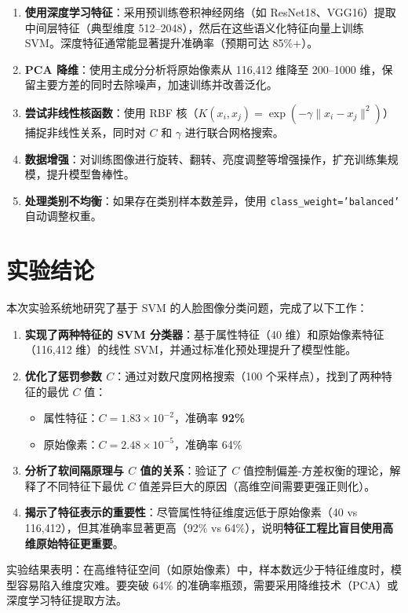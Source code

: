 \documentclass[UTF8]{ctexart}
\begin{document}
\begin{enumerate}
    \item \textbf{使用深度学习特征}：采用预训练卷积神经网络（如 ResNet18、VGG16）提取中间层特征（典型维度 512--2048），然后在这些语义化特征向量上训练 SVM。深度特征通常能显著提升准确率（预期可达 85\%+）。
    
    \item \textbf{PCA 降维}：使用主成分分析将原始像素从 116,412 维降至 200--1000 维，保留主要方差的同时去除噪声，加速训练并改善泛化。
    
    \item \textbf{尝试非线性核函数}：使用 RBF 核（$K(x_i, x_j) = \exp(-\gamma \|x_i - x_j\|^2)$）捕捉非线性关系，同时对 $C$ 和 $\gamma$ 进行联合网格搜索。
    
    \item \textbf{数据增强}：对训练图像进行旋转、翻转、亮度调整等增强操作，扩充训练集规模，提升模型鲁棒性。
    
    \item \textbf{处理类别不均衡}：如果存在类别样本数差异，使用 \texttt{class\_weight='balanced'} 自动调整权重。
\end{enumerate}

\section{实验结论}

本次实验系统地研究了基于 SVM 的人脸图像分类问题，完成了以下工作：

\begin{enumerate}
    \item \textbf{实现了两种特征的 SVM 分类器}：基于属性特征（40 维）和原始像素特征（116,412 维）的线性 SVM，并通过标准化预处理提升了模型性能。
    
    \item \textbf{优化了惩罚参数 $C$}：通过对数尺度网格搜索（100 个采样点），找到了两种特征的最优 $C$ 值：
    \begin{itemize}
        \item 属性特征：$C = 1.83 \times 10^{-2}$，准确率 \textbf{92\%}
        \item 原始像素：$C = 2.48 \times 10^{-5}$，准确率 64\%
    \end{itemize}
    
    \item \textbf{分析了软间隔原理与 $C$ 值的关系}：验证了 $C$ 值控制偏差-方差权衡的理论，解释了不同特征下最优 $C$ 值差异巨大的原因（高维空间需要更强正则化）。
    
    \item \textbf{揭示了特征表示的重要性}：尽管属性特征维度远低于原始像素（40 vs 116,412），但其准确率显著更高（92\% vs 64\%），说明\textbf{特征工程比盲目使用高维原始特征更重要}。
\end{enumerate}

\vspace{0.5em}
\noindent 实验结果表明：在高维特征空间（如原始像素）中，样本数远少于特征维度时，模型容易陷入维度灾难。要突破 64\% 的准确率瓶颈，需要采用降维技术（PCA）或深度学习特征提取方法。
\end{document}
